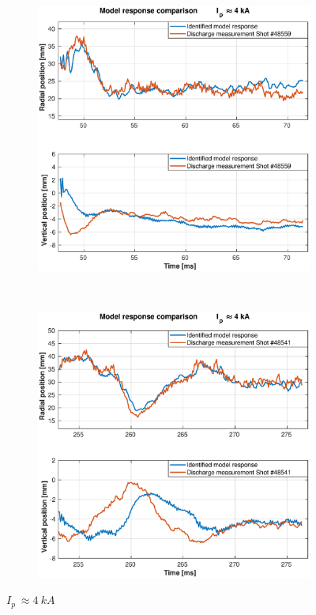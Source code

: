 \begin{figure}
	\begin{subfigure}[b]{0.55\textwidth}
		\includegraphics[width=\textwidth]{Chp5/SimResp_559.eps}  
		\caption{\label{SimResp559} }
	\end{subfigure}
	~ %
	\begin{subfigure}[b]{0.55\textwidth}
		\includegraphics[width=\textwidth]{Chp5/SimResp_541.eps}        
		\caption{\label{SimResp541}}
	\end{subfigure}
	\caption{$I_p~\approx 4~kA$ \label{SimResp_pos}}
\end{figure}


